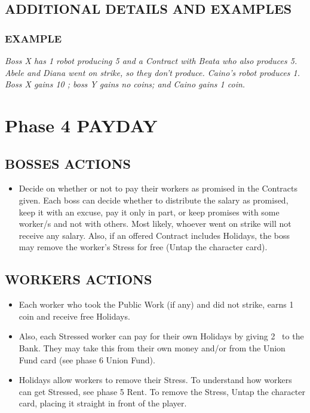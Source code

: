     \subsection{ADDITIONAL DETAILS AND EXAMPLES}

        \subsubsection{EXAMPLE}

            \textit{Boss X has 1 robot producing 5 and a Contract with Beata who also produces 5.
            Abele and Diana went on strike, so they don't produce. Caino's robot produces 1.
            Boss X gains 10 \faRubleSign; boss Y gains no coins; and Caino gains 1 coin.}


\section{Phase 4 PAYDAY}
    
    \subsection{BOSSES ACTIONS}

        \begin{itemize}
            \item Decide on whether or not to pay their workers as promised in the Contracts
            given. Each boss can decide whether to distribute the salary as promised,
            keep it with an excuse, pay it only in part, or keep promises with some
            worker/s and not with others. Most likely, whoever went on strike will not
            receive any salary. Also, if an offered Contract includes Holidays, the boss
            may remove the worker's Stress for free (Untap the character card).
        \end{itemize}
    
    \subsection{WORKERS ACTIONS}

        \begin{itemize}
            \item Each worker who took the Public Work (if any) and did not strike, earns 1
            coin and receive free Holidays.
            \item Also, each Stressed worker can pay for their own Holidays by giving 2 \faRubleSign\ to
            the Bank. They may take this from their own money and/or from the Union
            Fund card (see phase 6 Union Fund).
            \item Holidays allow workers to remove their Stress. To understand how workers
            can get Stressed, see phase 5 Rent. To remove the Stress, Untap the character
            card, placing it straight in front of the player.
        \end{itemize}
    
